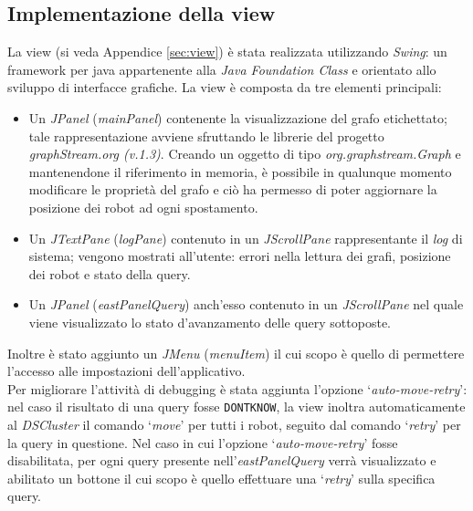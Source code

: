 \subsection{Implementazione della view}
\label{sec:viewImpl}
La view (si veda Appendice \ref{sec:view}) è stata realizzata utilizzando \emph{Swing}:
un framework per java appartenente
alla \emph{Java Foundation Class} e orientato allo sviluppo di interfacce grafiche.
La view è composta da tre elementi principali:
\begin{itemize}
	\item Un \emph{JPanel} (\emph{mainPanel}) contenente la visualizzazione
	del grafo etichettato; tale rappresentazione avviene sfruttando le librerie del progetto \emph{graphStream.org (v.1.3)}. Creando un oggetto di tipo \emph{org.graphstream.Graph} e mantenendone il riferimento in memoria, è possibile in qualunque momento modificare le proprietà
	del grafo e ciò ha permesso di poter aggiornare la posizione dei robot ad ogni spostamento.
	\item Un \emph{JTextPane} (\emph{logPane}) contenuto in un \emph{JScrollPane} rappresentante il \emph{log} di sistema; vengono mostrati all'utente: errori nella lettura dei grafi, posizione dei robot e stato della query.
	\item Un \emph{JPanel} (\emph{eastPanelQuery}) anch'esso contenuto in un \emph{JScrollPane} nel quale viene visualizzato lo stato d'avanzamento delle query sottoposte.
\end{itemize}
Inoltre è stato aggiunto un \emph{JMenu} (\emph{menuItem}) il cui scopo è quello di permettere l'accesso alle impostazioni dell'applicativo.\\

Per migliorare l'attività di debugging è stata aggiunta l'opzione `\emph{auto-move-retry}': nel caso il
risultato di una query fosse \texttt{DONTKNOW}, la view inoltra automaticamente al \emph{DSCluster} il comando `\emph{move}' per tutti i robot, seguito dal comando `\emph{retry}'
per la query in questione.
Nel caso in cui l'opzione `\emph{auto-move-retry}' fosse disabilitata, per ogni query presente nell'\emph{eastPanelQuery} verrà visualizzato e abilitato un bottone il cui scopo è quello effettuare
una `\emph{retry}' sulla specifica query.\\

